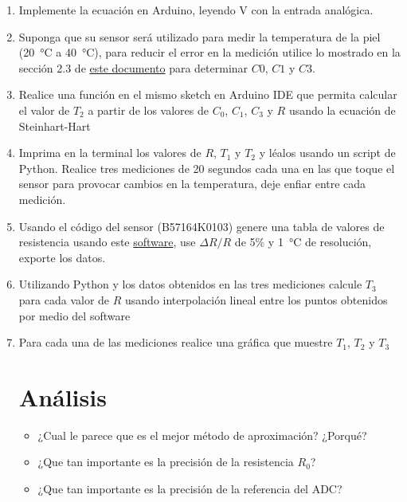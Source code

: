 \begin{enumerate}
\item Implemente la ecuación en Arduino, leyendo V con la entrada analógica.
\item Suponga que su sensor será utilizado para medir la temperatura de la piel (\SI{20}{\celsius} a \SI{40}{\celsius}), para reducir el error en la medición utilice lo mostrado en la sección 2.3 de \href{https://www.tdk-electronics.tdk.com/download/2999750/740594dd4ec109808826d1b5c774b3f6/ntc-thermistors-readout-trimming-an.pdf}{este documento} para determinar $C0$, $C1$ y $C3$.
\item Realice una función en el mismo sketch en Arduino IDE que permita calcular el valor de $T_2$ a partir de los valores de $C_0$, $C_1$, $C_3$ y $R$ usando la ecuación de Steinhart-Hart
\item Imprima en la terminal los valores de $R$, $T_1$ y $T_2$ y léalos usando un script de Python. Realice tres mediciones de 20 segundos cada una en las que toque el sensor para provocar cambios en la temperatura, deje enfiar entre cada medición. 
\item Usando el código del sensor (B57164K0103) genere una tabla de valores de resistencia usando este \href{https://tools.tdk-electronics.tdk.com/ntc/}{software}, use $\Delta R / R$ de 5\% y \SI{1}{\celsius} de resolución, exporte los datos.
\item Utilizando Python y los datos obtenidos en las tres mediciones calcule $T_3$ para cada valor de $R$ usando interpolación lineal entre los puntos obtenidos por medio del software 
\item Para cada una de las mediciones realice una gráfica que muestre $T_1$, $T_2$ y $T_3$
\section{Análisis}
\begin{itemize}
    \item ¿Cual le parece que es el mejor método de aproximación? ¿Porqué?
    \item ¿Que tan importante es la precisión de la resistencia $R_0$?
    \item ¿Que tan importante es la precisión de la referencia del ADC?
\end{itemize}

\end{enumerate}
